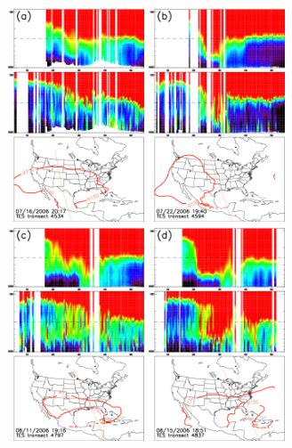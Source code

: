 	\begin{figure}
		\begin{center}%
		\includegraphics[width=1.6in]{o3/o3_4534_ftuv}
		\includegraphics[width=1.6in]{o3/o3_4594_ftuv}
		\includegraphics[width=1.6in]{o3/o3_4797_ftuv}
		\includegraphics[width=1.6in]{o3/o3_4837_ftuv}

\end{center}
\end{figure}
